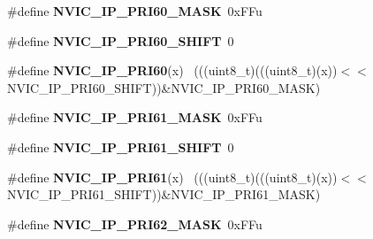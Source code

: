 \begin{DoxyCompactItemize}
\item 
\hypertarget{group___n_v_i_c___register___masks_ga36c9341d2f81a79375c9e4e131f5ba5e}{}\#define {\bfseries N\+V\+I\+C\+\_\+\+I\+P\+\_\+\+P\+R\+I60\+\_\+\+M\+A\+S\+K}~0x\+F\+Fu\label{group___n_v_i_c___register___masks_ga36c9341d2f81a79375c9e4e131f5ba5e}

\item 
\hypertarget{group___n_v_i_c___register___masks_gaa0a90b89fc70d2b18b9fae170bafd76b}{}\#define {\bfseries N\+V\+I\+C\+\_\+\+I\+P\+\_\+\+P\+R\+I60\+\_\+\+S\+H\+I\+F\+T}~0\label{group___n_v_i_c___register___masks_gaa0a90b89fc70d2b18b9fae170bafd76b}

\item 
\hypertarget{group___n_v_i_c___register___masks_ga75c08fea9753f484435edca67e0bae5f}{}\#define {\bfseries N\+V\+I\+C\+\_\+\+I\+P\+\_\+\+P\+R\+I60}(x)                                              ~(((uint8\+\_\+t)(((uint8\+\_\+t)(x))$<$$<$N\+V\+I\+C\+\_\+\+I\+P\+\_\+\+P\+R\+I60\+\_\+\+S\+H\+I\+F\+T))\&N\+V\+I\+C\+\_\+\+I\+P\+\_\+\+P\+R\+I60\+\_\+\+M\+A\+S\+K)\label{group___n_v_i_c___register___masks_ga75c08fea9753f484435edca67e0bae5f}

\item 
\hypertarget{group___n_v_i_c___register___masks_ga5df72327aa135cd86fa59f62286f2927}{}\#define {\bfseries N\+V\+I\+C\+\_\+\+I\+P\+\_\+\+P\+R\+I61\+\_\+\+M\+A\+S\+K}~0x\+F\+Fu\label{group___n_v_i_c___register___masks_ga5df72327aa135cd86fa59f62286f2927}

\item 
\hypertarget{group___n_v_i_c___register___masks_ga80e948207d6695fb5ff9ff0fe9bb00ba}{}\#define {\bfseries N\+V\+I\+C\+\_\+\+I\+P\+\_\+\+P\+R\+I61\+\_\+\+S\+H\+I\+F\+T}~0\label{group___n_v_i_c___register___masks_ga80e948207d6695fb5ff9ff0fe9bb00ba}

\item 
\hypertarget{group___n_v_i_c___register___masks_gad071c2b7ce553e6b335879b3fdce186e}{}\#define {\bfseries N\+V\+I\+C\+\_\+\+I\+P\+\_\+\+P\+R\+I61}(x)                                              ~(((uint8\+\_\+t)(((uint8\+\_\+t)(x))$<$$<$N\+V\+I\+C\+\_\+\+I\+P\+\_\+\+P\+R\+I61\+\_\+\+S\+H\+I\+F\+T))\&N\+V\+I\+C\+\_\+\+I\+P\+\_\+\+P\+R\+I61\+\_\+\+M\+A\+S\+K)\label{group___n_v_i_c___register___masks_gad071c2b7ce553e6b335879b3fdce186e}

\item 
\hypertarget{group___n_v_i_c___register___masks_ga2099bbe97e6361311d94e2ea4ee079fd}{}\#define {\bfseries N\+V\+I\+C\+\_\+\+I\+P\+\_\+\+P\+R\+I62\+\_\+\+M\+A\+S\+K}~0x\+F\+Fu\label{group___n_v_i_c___register___masks_ga2099bbe97e6361311d94e2ea4ee079fd}


\end{DoxyCompactItemize}
